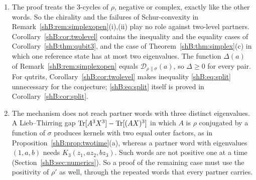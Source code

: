 \begin{remark}\label{shB:rem:LTscope}
\begin{enumerate}[label=(\roman*)]
\item The proof treats the $3$-cycles of $\rho$, negative or complex, exactly like the other words. So the chirality and the failures of Schur-convexity in Remark~\ref{shB:rem:simplexopen}(i),(ii) play no role against two-level partners. Corollary~\ref{shB:cor:twolevel} contains the inequality and the equality cases of Corollary~\ref{shB:thm:qubit3}, and the case of Theorem~\ref{shB:thm:simplex}(c) in which one reference state has at most two eigenvalues. The function $\Delta(a)$ of Remark~\ref{shB:rem:simplexopen} equals $\mathcal D_{\rho\|\sigma}(a)$, so $\Delta\ge0$ for every pair. For qutrits, Corollary~\ref{shB:cor:twolevel} makes inequality \eqref{shB:eq:split} unnecessary for the conjecture; \eqref{shB:eq:split} itself is proved in Corollary~\ref{shB:cor:split}.
\item The mechanism does not reach partner words with three distinct eigenvalues. A Lieb--Thirring gap $\operatorname{Tr}[A^3X^3]-\operatorname{Tr}[(AX)^3]$ in which $A$ is $\rho$ conjugated by a function of $\sigma$ produces kernels with two equal outer factors, as in Proposition~\ref{shB:prop:twotime}(a), whereas a partner word with eigenvalues $(1,a,b)$ needs $K_3(z_1,az_2,bz_3)$. Such words are not positive one at a time (Section~\ref{shB:sec:numerics}). So a proof of the remaining case must use the positivity of $\rho'$ as well, through the repeated words that every partner carries.

\end{enumerate}
\end{remark}
